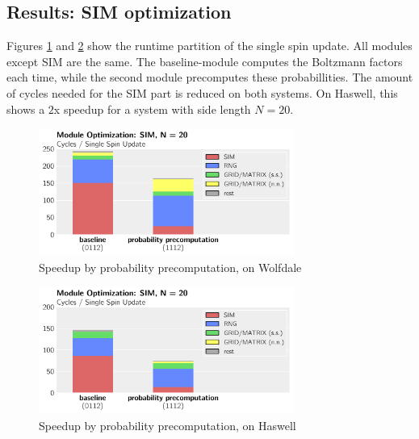\documentclass[letterpaper]{article}
\begin{document}
\subsection{Results: SIM optimization}
Figures \ref{SIM:Wolf:20} and \ref{SIM:Has:20} show the runtime partition of the single spin update. All modules except SIM are the same. The baseline-module computes the Boltzmann factors each time, while the second module precomputes these probabillities. The amount of cycles needed for the SIM part is reduced on both systems. On Haswell, this shows a $2$x speedup for a system with side length $N = 20$.
	\begin{figure}[H]\centering
	  \includegraphics[width = 8.36cm]{plots/msk_20_2.pdf}
	  \caption{Speedup by probability precomputation, on Wolfdale}
	  \label{SIM:Wolf:20}
	\end{figure}
	\begin{figure}[h]\centering
	  \includegraphics[width = 8.36cm]{plots/dg_20_2.pdf}
	  \caption{Speedup by probability precomputation, on Haswell}
	  \label{SIM:Has:20}
	\end{figure}
\end{document}
